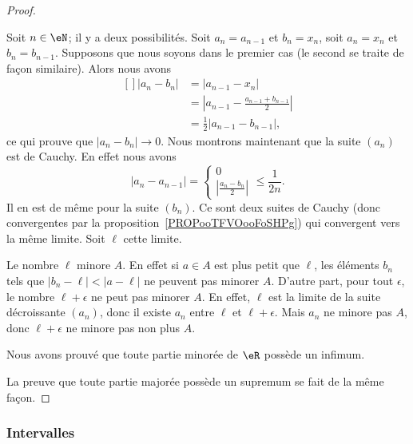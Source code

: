\begin{proof}
\begin{subproof}
	Soit $n\in\eN$; il y a deux possibilités. Soit $a_n=a_{n-1}$ et $b_n=x_n$, soit $a_n=x_n$ et $b_n=b_{n-1}$. Supposons que nous soyons dans le premier cas (le second se traite de façon similaire). Alors nous avons
	\begin{equation}
		\begin{aligned}[]
			| a_n-b_n |&=| a_{n-1}-x_n |\\
			&=\left| a_{n-1}-\frac{ a_{n-1}+b_{n-1} }{2} \right| \\
			&=\frac{ 1 }{2}| a_{n-1}-b_{n-1} |,
		\end{aligned}
	\end{equation}
	ce qui prouve que $| a_n-b_n |\to 0$. Nous montrons maintenant que la suite \( (a_n)\) est de Cauchy. En effet nous avons
    \begin{equation}
        | a_n-a_{n-1} |=\begin{cases}
          0\\
          \left| \frac{ a_n -b_n}{ 2} \right|
      \end{cases}\leq \frac{1}{ 2n }.
    \end{equation}
    Il en est de même pour la suite \( (b_n)\). Ce sont deux suites de Cauchy (donc convergentes par la proposition~\ref{PROPooTFVOooFoSHPg}) qui convergent vers la même limite. Soit \( \ell\) cette limite.

	Le nombre $\ell$ minore $A$. En effet si $a\in A$ est plus petit que $\ell$, les éléments $b_n$ tels que $| b_n-\ell |<| a-\ell |$ ne peuvent pas minorer $A$. D'autre part, pour tout $\epsilon$, le nombre $\ell+\epsilon$ ne peut pas minorer $A$. En effet, $\ell$ est la limite de la suite décroissante $(a_n)$, donc il existe $a_n$ entre $\ell$ et $\ell+\epsilon$. Mais $a_n$ ne minore pas $A$, donc $\ell+\epsilon$ ne minore pas non plus $A$.

	Nous avons prouvé que toute partie minorée de $\eR$ possède un infimum.
    \end{subproof}

    La preuve que toute partie majorée possède un supremum se fait de la même façon.
\end{proof}

\subsubsection{Intervalles}

